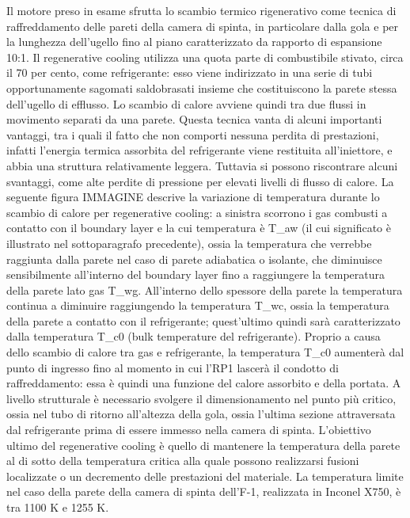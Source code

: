 Il motore preso in esame sfrutta lo scambio termico rigenerativo come tecnica di raffreddamento delle pareti della camera di spinta, in particolare dalla gola e per la lunghezza dell'ugello fino al piano caratterizzato da rapporto di espansione 10:1. Il regenerative cooling utilizza una quota parte di combustibile stivato, circa il 70 per cento, come refrigerante: esso viene indirizzato in una serie di tubi opportunamente sagomati saldobrasati insieme che costituiscono la parete stessa dell'ugello di efflusso. Lo scambio di calore avviene quindi tra due flussi in movimento separati da una parete. 
Questa tecnica vanta di alcuni importanti vantaggi, tra i quali il fatto che non comporti nessuna perdita di prestazioni, infatti l'energia termica assorbita del refrigerante viene restituita all'iniettore, e abbia una struttura relativamente leggera. Tuttavia si possono riscontrare alcuni svantaggi, come alte perdite di pressione per elevati livelli di flusso di calore.
La seguente figura IMMAGINE descrive la variazione di temperatura durante lo scambio di calore per regenerative cooling: a sinistra scorrono i gas combusti a contatto con il boundary layer e la cui temperatura è T_{aw} (il cui significato è illustrato nel sottoparagrafo precedente), ossia la temperatura che verrebbe raggiunta dalla parete nel caso di parete adiabatica o isolante, che diminuisce sensibilmente all'interno del boundary layer fino a raggiungere la temperatura della parete lato gas T_{wg}. All'interno dello spessore della parete la temperatura continua a diminuire raggiungendo la temperatura T_{wc}, ossia la temperatura della parete a contatto con il refrigerante; quest'ultimo quindi sarà caratterizzato dalla temperatura T_{c0} (bulk temperature del refrigerante).
Proprio a causa dello scambio di calore tra gas e refrigerante, la temperatura T_{c0} aumenterà dal punto di ingresso fino al momento in cui l'RP1 lascerà il condotto di raffreddamento: essa è quindi una funzione del calore assorbito e della portata. A livello strutturale è necessario svolgere il dimensionamento nel punto più critico, ossia nel tubo di ritorno all'altezza della gola, ossia l'ultima sezione attraversata dal refrigerante prima di essere immesso nella camera di spinta.
L'obiettivo ultimo del regenerative cooling è quello di mantenere la temperatura della parete al di sotto della temperatura critica alla quale possono realizzarsi fusioni localizzate o un decremento delle prestazioni del materiale. La temperatura limite nel caso della parete della camera di spinta dell'F-1, realizzata in Inconel X750, è tra 1100 K e 1255 K.
